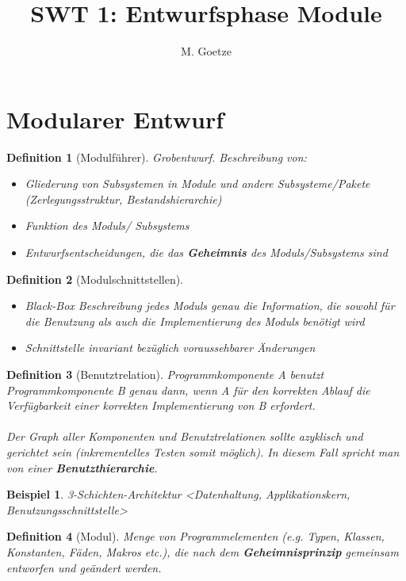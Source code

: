 \documentclass[a4paper]{article}
\title{SWT 1: Entwurfsphase Module}
\author{M. Goetze}
\theoremstyle{break}
\newtheorem{defi}{Definition}[section]
\newtheorem{ex}{Beispiel}[section]
\begin{document}
	\maketitle
	\tableofcontents
	\newpage
	
\section{Modularer Entwurf}
\begin{defi}[Modulführer]
	Grobentwurf. Beschreibung von:
	\begin{itemize}
		\item Gliederung von Subsystemen in Module und andere Subsysteme/Pakete (Zerlegungsstruktur, Bestandshierarchie)
		\item Funktion des Moduls/ Subsystems
		\item Entwurfsentscheidungen, die das \textbf{Geheimnis} des Moduls/Subsystems sind
	\end{itemize}
\end{defi}

\begin{defi}[Modulschnittstellen]
	\begin{itemize}
		\item Black-Box Beschreibung jedes Moduls
		\subitem genau die Information, die sowohl für die Benutzung als auch die Implementierung des Moduls benötigt wird
		\item Schnittstelle invariant bezüglich voraussehbarer Änderungen
	\end{itemize}

\end{defi}

\begin{defi}[Benutztrelation]
	Programmkomponente A benutzt Programmkomponente B genau dann, wenn A für den korrekten Ablauf die Verfügbarkeit einer korrekten Implementierung von B erfordert.\\
	\\
	Der Graph aller Komponenten und Benutztrelationen sollte azyklisch und gerichtet sein (inkrementelles Testen somit möglich). In diesem Fall spricht man von einer \textbf{Benutzthierarchie}.
\end{defi}

\begin{ex}
	3-Schichten-Architektur
	<Datenhaltung, Applikationskern, Benutzungsschnittstelle>
\end{ex}

\begin{defi}[Modul]
	Menge von Programmelementen (e.g. Typen, Klassen, Konstanten, Fäden, Makros etc.), die nach dem \textbf{Geheimnisprinzip} gemeinsam entworfen und geändert werden. 
\end{defi}
	
\end{document}
